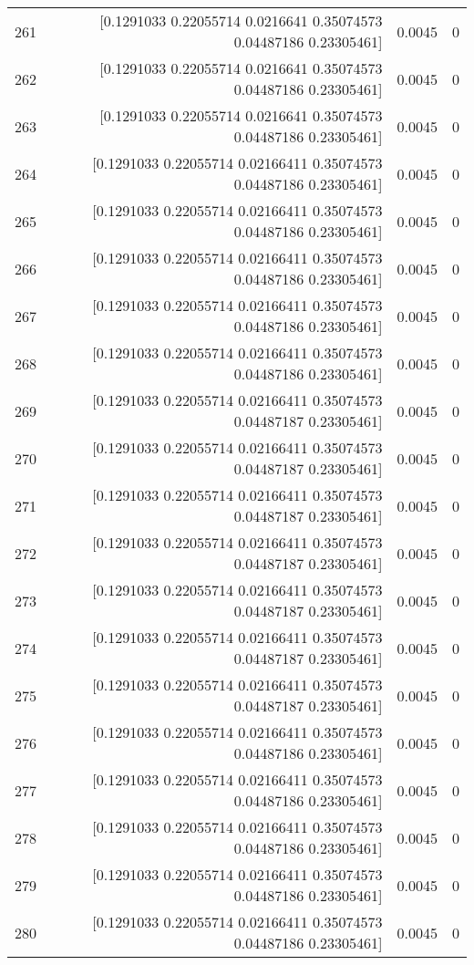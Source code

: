 \begin{longtable}{lrrr}
261 & [0.1291033  0.22055714 0.0216641  0.35074573 0.04487186 0.23305461] & 0.0045 & 0 \\
262 & [0.1291033  0.22055714 0.0216641  0.35074573 0.04487186 0.23305461] & 0.0045 & 0 \\
263 & [0.1291033  0.22055714 0.0216641  0.35074573 0.04487186 0.23305461] & 0.0045 & 0 \\
264 & [0.1291033  0.22055714 0.02166411 0.35074573 0.04487186 0.23305461] & 0.0045 & 0 \\
265 & [0.1291033  0.22055714 0.02166411 0.35074573 0.04487186 0.23305461] & 0.0045 & 0 \\
266 & [0.1291033  0.22055714 0.02166411 0.35074573 0.04487186 0.23305461] & 0.0045 & 0 \\
267 & [0.1291033  0.22055714 0.02166411 0.35074573 0.04487186 0.23305461] & 0.0045 & 0 \\
268 & [0.1291033  0.22055714 0.02166411 0.35074573 0.04487186 0.23305461] & 0.0045 & 0 \\
269 & [0.1291033  0.22055714 0.02166411 0.35074573 0.04487187 0.23305461] & 0.0045 & 0 \\
270 & [0.1291033  0.22055714 0.02166411 0.35074573 0.04487187 0.23305461] & 0.0045 & 0 \\
271 & [0.1291033  0.22055714 0.02166411 0.35074573 0.04487187 0.23305461] & 0.0045 & 0 \\
272 & [0.1291033  0.22055714 0.02166411 0.35074573 0.04487187 0.23305461] & 0.0045 & 0 \\
273 & [0.1291033  0.22055714 0.02166411 0.35074573 0.04487187 0.23305461] & 0.0045 & 0 \\
274 & [0.1291033  0.22055714 0.02166411 0.35074573 0.04487187 0.23305461] & 0.0045 & 0 \\
275 & [0.1291033  0.22055714 0.02166411 0.35074573 0.04487187 0.23305461] & 0.0045 & 0 \\
276 & [0.1291033  0.22055714 0.02166411 0.35074573 0.04487186 0.23305461] & 0.0045 & 0 \\
277 & [0.1291033  0.22055714 0.02166411 0.35074573 0.04487186 0.23305461] & 0.0045 & 0 \\
278 & [0.1291033  0.22055714 0.02166411 0.35074573 0.04487186 0.23305461] & 0.0045 & 0 \\
279 & [0.1291033  0.22055714 0.02166411 0.35074573 0.04487186 0.23305461] & 0.0045 & 0 \\
280 & [0.1291033  0.22055714 0.02166411 0.35074573 0.04487186 0.23305461] & 0.0045 & 0 \\

\end{longtable}
